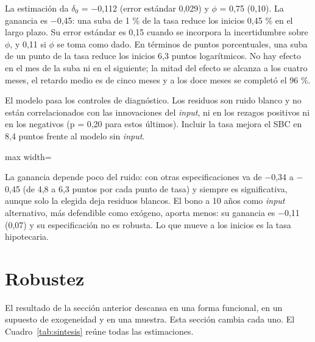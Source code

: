 \documentclass[11pt,a4paper]{article}
\newcommand{\tabla}[3]{\begin{table}[htbp]\centering\small\caption{#2}\label{#3}\begin{adjustbox}{max width=\linewidth}\end{adjustbox}\end{table}}
\begin{document}
La estimación da $\delta_0$ = $-$0,112 (error estándar 0,029) y $\phi$ = 0,75 (0,10). La ganancia es $-$0,45: una suba de 1 \% de la tasa reduce los inicios 0,45 \% en el largo plazo. Su error estándar es 0,15 cuando se incorpora la incertidumbre sobre $\phi$, y 0,11 si $\phi$ se toma como dado. En términos de puntos porcentuales, una suba de un punto de la tasa reduce los inicios 6,3 puntos logarítmicos. No hay efecto en el mes de la suba ni en el siguiente; la mitad del efecto se alcanza a los cuatro meses, el retardo medio es de cinco meses y a los doce meses se completó el 96 \%.

El modelo pasa los controles de diagnóstico. Los residuos son ruido blanco y no están correlacionados con las innovaciones del \emph{input}, ni en los rezagos positivos ni en los negativos (p = 0,20 para estos últimos). Incluir la tasa mejora el SBC en 8,4 puntos frente al modelo sin \emph{input}.

\tabla{09_robustez_ruido.tex}{Ganancia de la tasa con distintas especificaciones del ruido.}{tab:ruido}


La ganancia depende poco del ruido: con otras especificaciones va de $-$0,34 a $-$0,45 (de 4,8 a 6,3 puntos por cada punto de tasa) y siempre es significativa, aunque solo la elegida deja residuos blancos. El bono a 10 años como \emph{input} alternativo, más defendible como exógeno, aporta menos: su ganancia es $-$0,11 (0,07) y su especificación no es robusta. Lo que mueve a los inicios es la tasa hipotecaria.

\section{Robustez}

El resultado de la sección anterior descansa en una forma funcional, en un supuesto de exogeneidad y en una muestra. Esta sección cambia cada uno. El Cuadro~\ref{tab:sintesis} reúne todas las estimaciones.
\end{document}
